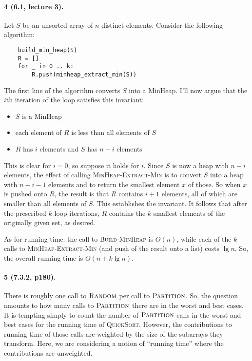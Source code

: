 \documentclass[
]{article}
\begin{document}
\paragraph{4 (6.1, lecture 3).} Let $S$ be an unsorted array of $n$ distinct elements.  Consider the following algorithm:
\begin{verbatim}
    build_min_heap(S)
    R = []
    for _ in 0 .. k:
        R.push(minheap_extract_min(S))
\end{verbatim}
The first line of the algorithm converts $S$ into a MinHeap.  I'll now argue that the $i$th iteration of the loop satisfies this invariant: 
\begin{itemize}
\item $S$ is a MinHeap
\item each element of $R$ is less than all elements of $S$
\item $R$ has $i$ elements and $S$ has $n-i$ elements
\end{itemize}
This is clear for $i=0$, so suppose it holds for $i$.  Since $S$ is now a heap with $n-i$ elements, the effect of calling \textsc{MinHeap-Extract-Min} is to convert $S$ into a heap with $n-i-1$ elements and to return the smallest element $x$ of those.  So when $x$ is pushed onto $R$, the result is that $R$ contains $i+1$ elements, all of which are smaller than all elements of $S$.  This establishes the invariant.  It follows that after the prescribed $k$ loop iterations, $R$ contains the $k$ smallest elements of the originally given set, as desired.

As for running time: the call to \textsc{Build-MinHeap} is $O(n)$, while each of the $k$ calls to \textsc{MinHeap-Extract-Min} (and push of the result onto a list) costs $\lg n$.  So, the overall running time is $O(n + k\lg n)$.

\paragraph{5 (7.3.2, p180).} 
There is roughly one call to $\textsc{Random}$ per call to $\textsc{Partition}$.  So, the question amounts to how many calls to $\textsc{Partition}$ there are in the worst and best cases.  
It is tempting simply to count the number of $\textsc{Partition}$ calls in the worst and best cases for the running time of \textsc{QuickSort}.  However, the contributions to running time of those calls are weighted by the size of the subarrays they transform.  Here, we are considering a notion of ``running time'' where the contributions are unweighted.
\end{document}
